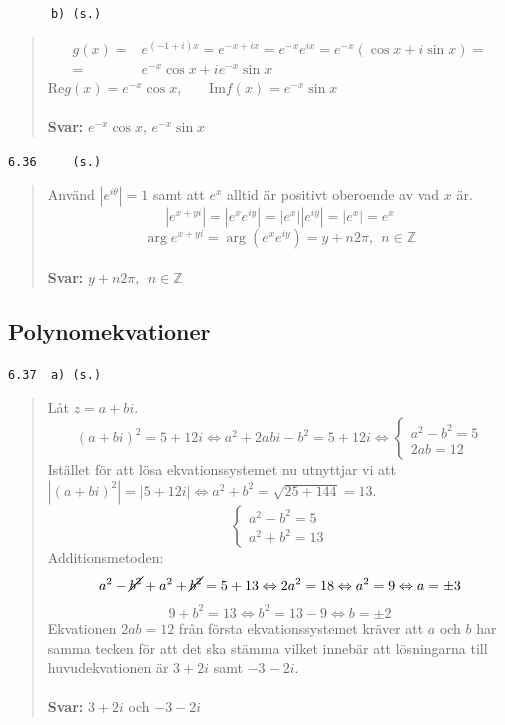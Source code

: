 \documentclass[a4paper]{article}
\newcommand{\tskcol}[1]{\textcolor{tskcol}{#1}}
\begin{document}
	\texttt{\tskcol{~~~~~~b) (s.)}}
	\begin{quotation}
		\noindent
		\begin{align*}
		g(x)=&e^{(-1+i)x}=
		e^{-x+ix}=
		e^{-x}e^{ix}=
		e^{-x}(\cos x + i\sin x)=  \\ =
		&e^{-x}\cos x + ie^{-x}\sin x
		\end{align*}
		Re$g(x)=e^{-x}\cos x$,~~~~Im$f(x)=e^{-x}\sin x$
		\\ \\
		\textbf{Svar:} $e^{-x}\cos x$, $e^{-x}\sin x$
	\end{quotation}
	
	\texttt{\tskcol{6.36~~~~ (s.)}}
	\begin{quotation}
		\noindent
		Använd $|e^{i\theta}|=1$ samt att $e^x$ alltid är positivt oberoende av vad $x$ är.
		\[|e^{x+yi}|=
		|e^xe^{iy}|=
		|e^x||e^{iy}|=
		|e^x|=e^x\]
		\[\arg e^{x+yi}=\arg(e^xe^{iy})=y+n2\pi,~~n\in\mathbb{Z}\]
		\\
		\textbf{Svar:} $y+n2\pi,~~n\in\mathbb{Z}$
	\end{quotation}
	
	\subsection*{Polynomekvationer}
	
	\texttt{\tskcol{6.37~~a) (s.)}}
	\begin{quotation}
		\noindent
		Låt $z=a+bi$.
		\[(a+bi)^2=5+12i \Leftrightarrow
		a^2+2abi-b^2=5+12i \Leftrightarrow
		\begin{cases}
		a^2-b^2=5 \\
		2ab=12
		\end{cases}\]
		Istället för att lösa ekvationssystemet nu utnyttjar vi  att $|(a+bi)^2|=|5+12i| \Leftrightarrow a^2+b^2=\sqrt{25+144}=13$.
		\[\begin{cases}
		a^2-b^2 = 5 \\
		a^2+b^2 = 13
		\end{cases}\]
		Additionsmetoden:
		\[a^2-\cancel{b^2}+a^2+\cancel{b^2} = 5+13 \Leftrightarrow
		2a^2=18 \Leftrightarrow
		a^2=9 \Leftrightarrow
		a=\pm3\]
		\[9+b^2=13 \Leftrightarrow
		b^2=13-9 \Leftrightarrow
		b=\pm 2\]
		Ekvationen $2ab=12$ från första ekvationssystemet kräver att $a$ och $b$ har samma tecken för att det ska stämma vilket innebär att lösningarna till huvudekvationen är $3+2i$ samt $-3-2i$.
		\\ \\
		\textbf{Svar:} $3+2i$ och $-3-2i$
	\end{quotation}
	
\end{document}
